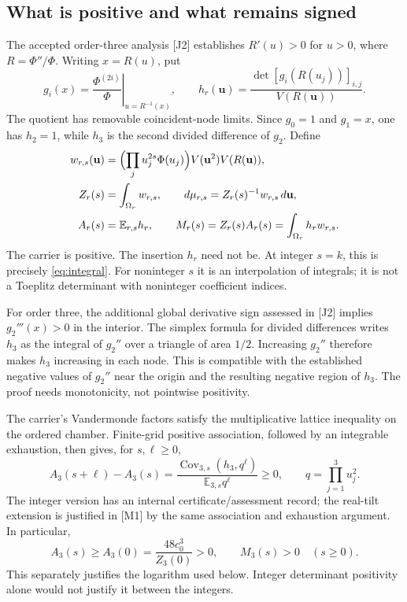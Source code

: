 \documentclass[11pt,letterpaper]{article}
\numberwithin{equation}{section}
\theoremstyle{remark}
\DeclareMathOperator{\Cov}{Cov}
\newcommand{\E}{\mathbb E}
\newcommand{\dd}{\,d}
\newcommand{\evid}[1]{\textsf{[#1]}}
\begin{document}
\subsection{What is positive and what remains signed}

The accepted order-three analysis \evid{J2} establishes
$R'(u)>0$ for $u>0$, where $R=\Phi''/\Phi$.
Writing $x=R(u)$, put
\begin{equation}
 g_i(x)=\left.\frac{\Phi^{(2i)}}{\Phi}\right|_{u=R^{-1}(x)},
 \qquad
 h_r(\mathbf u)=\frac{\det[g_i(R(u_j))]_{i,j}}{V(R(\mathbf u))}.
 \label{eq:hr}
\end{equation}
The quotient has removable coincident-node limits. Since $g_0=1$ and
$g_1=x$, one has $h_2=1$, while $h_3$ is the second divided difference
of $g_2$. Define
\begin{align}
 w_{r,s}(\mathbf u)&=\Bigl(\prod_j u_j^{2s}\Phi(u_j)\Bigr)
                     V(\mathbf u^2)V(R(\mathbf u)),\notag\\
 Z_r(s)&=\int_{\Omega_r}w_{r,s},\qquad
 d\mu_{r,s}=Z_r(s)^{-1}w_{r,s}\dd\mathbf u,\notag\\
 A_r(s)&=\E_{r,s}h_r,\qquad
 M_r(s)=Z_r(s)A_r(s)=\int_{\Omega_r}h_rw_{r,s}. \label{eq:carrier}
\end{align}
The carrier is positive. The insertion $h_r$ need not be.
At integer $s=k$, this is precisely \eqref{eq:integral}.
For noninteger $s$ it is an interpolation of integrals; it is not a
Toeplitz determinant with noninteger coefficient indices.

For order three, the additional global derivative sign assessed in
\evid{J2} implies $g_2'''(x)>0$ in the interior. The simplex formula
for divided differences writes $h_3$ as the integral of $g_2''$ over a
triangle of area $1/2$. Increasing $g_2''$ therefore makes $h_3$
increasing in each node. This is compatible with the established
negative values of $g_2''$ near the origin and the resulting negative
region of $h_3$. The proof needs monotonicity, not pointwise positivity.

The carrier's Vandermonde factors satisfy the multiplicative lattice
inequality on the ordered chamber. Finite-grid positive association,
followed by an integrable exhaustion, then gives, for $s,\ell\ge0$,
\begin{equation}
 A_3(s+\ell)-A_3(s)
 =\frac{\Cov_{3,s}(h_3,q^\ell)}{\E_{3,s}q^\ell}\ge0,
 \qquad q=\prod_{j=1}^3u_j^2. \label{eq:association}
\end{equation}
The integer version has an internal certificate/assessment record;
the real-tilt extension is justified in \evid{M1} by the same
association and exhaustion argument. In particular,
\begin{equation}
 A_3(s)\ge A_3(0)=\frac{48c_0^3}{Z_3(0)}>0,
 \qquad M_3(s)>0\quad(s\ge0). \label{eq:realpositive}
\end{equation}
This separately justifies the logarithm used below. Integer determinant
positivity alone would not justify it between the integers.
\end{document}

